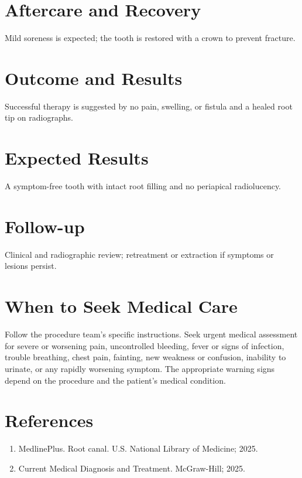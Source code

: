 \section*{Aftercare and Recovery}
Mild soreness is expected; the tooth is restored with a crown to prevent fracture.

\section*{Outcome and Results}
Successful therapy is suggested by no pain, swelling, or fistula and a healed root tip on radiographs.

\section*{Expected Results}
A symptom-free tooth with intact root filling and no periapical radiolucency.

\section*{Follow-up}
Clinical and radiographic review; retreatment or extraction if symptoms or lesions persist.

\section*{When to Seek Medical Care}
Follow the procedure team's specific instructions. Seek urgent medical assessment for severe or worsening pain, uncontrolled bleeding, fever or signs of infection, trouble breathing, chest pain, fainting, new weakness or confusion, inability to urinate, or any rapidly worsening symptom. The appropriate warning signs depend on the procedure and the patient's medical condition.

\section*{References}
\begin{enumerate}
  \item MedlinePlus. Root canal. U.S. National Library of Medicine; 2025.
  \item Current Medical Diagnosis and Treatment. McGraw-Hill; 2025.
\end{enumerate}

\clearpage
